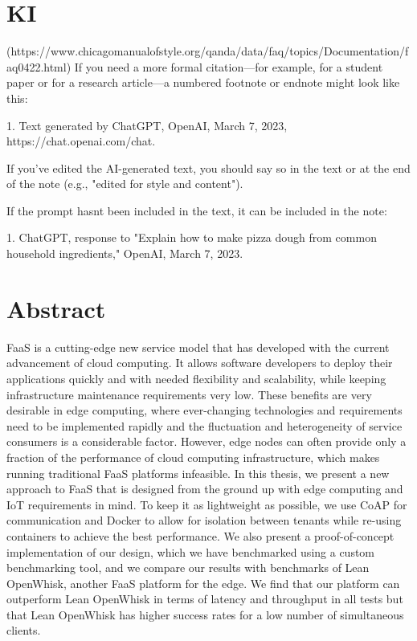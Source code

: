 \documentclass[a4paper, 11pt]{article}
\begin{document}

\clearpage
\pagestyle{plain}

\newpage

\section*{KI}
(https://www.chicagomanualofstyle.org/qanda/data/faq/topics/Documentation/faq0422.html)
If you need a more formal citation—for example, for a student paper or for a research article—a numbered footnote or endnote might look like this:

1. Text generated by ChatGPT, OpenAI, March 7, 2023, https://chat.openai.com/chat.

If you've edited the AI-generated text, you should say so in the text or at the end of the note (e.g., "edited for style and content"). 

If the prompt hasnt been included in the text, it can be included in the note:

1. ChatGPT, response to "Explain how to make pizza dough from common household ingredients," OpenAI, March 7, 2023.



\newpage
\section*{Abstract}

FaaS is a cutting-edge new service model that has developed with the current advancement of cloud computing.
It allows software developers to deploy their applications quickly and with needed flexibility and scalability, while keeping infrastructure maintenance requirements very low.
These benefits are very desirable in edge computing, where ever-changing technologies and requirements need to be implemented rapidly and the fluctuation and heterogeneity of service consumers is a considerable factor.
However, edge nodes can often provide only a fraction of the performance of cloud computing infrastructure, which makes running traditional FaaS platforms infeasible.
In this thesis, we present a new approach to FaaS that is designed from the ground up with edge computing and IoT requirements in mind.
To keep it as lightweight as possible, we use CoAP for communication and Docker to allow for isolation between tenants while re-using containers to achieve the best performance.
We also present a proof-of-concept implementation of our design, which we have benchmarked using a custom benchmarking tool, and we compare our results with benchmarks of Lean OpenWhisk, another FaaS platform for the edge.
We find that our platform can outperform Lean OpenWhisk in terms of latency and throughput in all tests but that Lean OpenWhisk has higher success rates for a low number of simultaneous clients.
\end{document}
